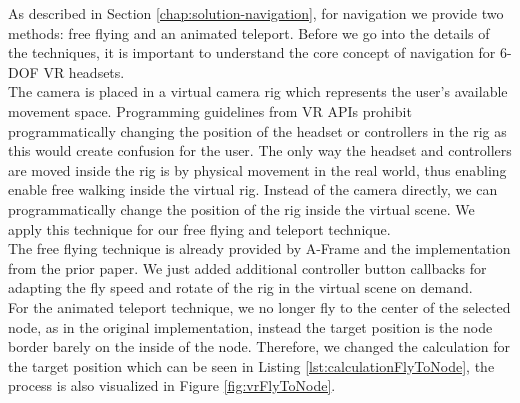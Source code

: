 As described in Section \ref{chap:solution-navigation}, for navigation we provide two methods: free flying and an animated teleport.
Before we go into the details of the techniques, it is important to understand the core concept of navigation for 6-DOF VR headsets.\\
The camera is placed in a virtual camera rig which represents the user's available movement space. %
Programming guidelines from VR APIs prohibit programmatically changing the position of the headset or controllers in the rig as this would create confusion for the user. 
The only way the headset and controllers are moved inside the rig is by physical movement in the real world, thus enabling enable free walking inside the virtual rig.
Instead of the camera directly, we can programmatically change the position of the rig inside the virtual scene. 
We apply this technique for our free flying and teleport technique.
\\
The free flying technique is already provided by A-Frame and the implementation from the prior paper.
We just added additional controller button callbacks for adapting the fly speed and rotate of the rig in the virtual scene on demand.\\
For the animated teleport technique, we no longer fly to the center of the selected node, as in the original implementation, instead the target position is the node border barely on the inside of the node. Therefore, we changed the calculation for the target position which can be seen in Listing \ref{lst:calculationFlyToNode}, the process is also visualized in Figure \ref{fig:vrFlyToNode}.

